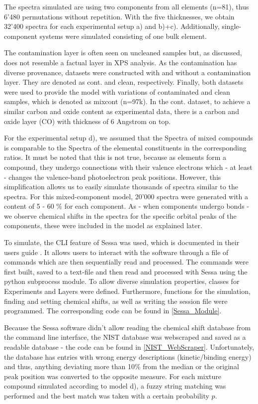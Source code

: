 The spectra simulated are using two components from all elements (n=81), thus 6'480 permutations without repetition. With the five thicknesses, we obtain 32'400 spectra for each experimental setup a) and b)+c). Additionally, single-component systems were simulated consisting of one bulk element.

The contamination layer is often seen on uncleaned samples but, as discussed, does not resemble a factual layer in XPS analysis. As the contamination has diverse provenance, datasets were constructed with and without a contamination layer. They are denoted as cont. and clean, respectively. Finally, both datasets were used to provide the model with variations of contaminated and clean samples, which is denoted as mixcont (n=97k).
In the cont. dataset, to achieve a similar carbon and oxide content as experimental data, there is a carbon and oxide layer (CO) with thickness of 6 Angstrom on top.

For the experimental setup d), we assumed that the Spectra of mixed compounds is comparable to the Spectra of the elemental constituents in the corresponding ratios. It must be noted that this is not true, because as elements form a compound, they undergo connections with their valence electrons which - at least - changes the valence-band photoelectron peak positions. However, this simplification allows us to easily simulate thousands of spectra similar to the spectra. For this mixed-component model, 20'000 spectra were generated with a content of 5 - 60 \% for each component. As - when components undergo bonds - we observe chemical shifts in the spectra for the specific orbital peaks of the components, these were included in the model as explained later.

To simulate, the CLI feature of Sessa was used, which is documented in their users guide \cite{werner_simulation_2021}. It allows users to interact with the software through a file of commands which are then sequentially read and processed. The commands were first built, saved to a text-file and then read and processed with Sessa using the python subprocess module. To allow diverse simulation properties, classes for Experiments and Layers were defined. Furthermore, functions for the simulation, finding and setting chemical shifts, as well as writing the session file were programmed. The corresponding code can be found in \ref{Sessa_Module}.

Because the Sessa software didn't allow reading the chemical shift database from the command line interface, the NIST database was webscraped and saved as a readable database - the code can be found in \ref{NIST_WebScraper}. Unfortunately, the database has entries with wrong energy descriptions (kinetic/binding energy) and thus, anything deviating more than 10\% from the median or the original peak position was converted to the opposite measure.
For each mixture compound simulated according to model d), a fuzzy string matching was performed and the best match was taken with a certain probability $p$.


